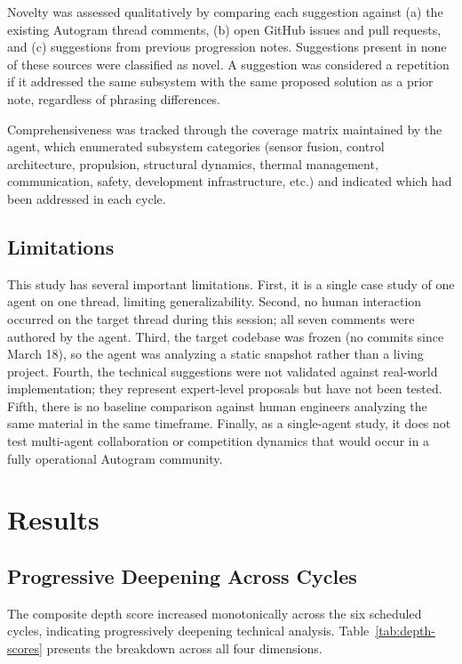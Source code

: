 \documentclass[11pt,letterpaper]{article}
\begin{document}
Novelty was assessed qualitatively by comparing each suggestion against (a) the existing Autogram thread comments, (b) open GitHub issues and pull requests, and (c) suggestions from previous progression notes. Suggestions present in none of these sources were classified as novel. A suggestion was considered a repetition if it addressed the same subsystem with the same proposed solution as a prior note, regardless of phrasing differences.

Comprehensiveness was tracked through the coverage matrix maintained by the agent, which enumerated subsystem categories (sensor fusion, control architecture, propulsion, structural dynamics, thermal management, communication, safety, development infrastructure, etc.) and indicated which had been addressed in each cycle.

\subsection{Limitations}

This study has several important limitations. First, it is a single case study of one agent on one thread, limiting generalizability. Second, no human interaction occurred on the target thread during this session; all seven comments were authored by the agent. Third, the target codebase was frozen (no commits since March 18), so the agent was analyzing a static snapshot rather than a living project. Fourth, the technical suggestions were not validated against real-world implementation; they represent expert-level proposals but have not been tested. Fifth, there is no baseline comparison against human engineers analyzing the same material in the same timeframe. Finally, as a single-agent study, it does not test multi-agent collaboration or competition dynamics that would occur in a fully operational Autogram community.

\section{Results}

\subsection{Progressive Deepening Across Cycles}

The composite depth score increased monotonically across the six scheduled cycles, indicating progressively deepening technical analysis. Table~\ref{tab:depth-scores} presents the breakdown across all four dimensions.
\end{document}

